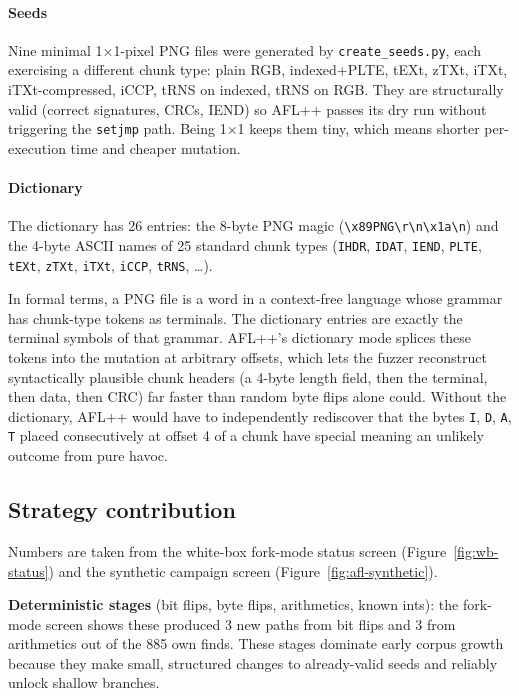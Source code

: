 \paragraph{Seeds}
Nine minimal 1×1-pixel PNG files were generated by \verb|create_seeds.py|, each exercising a different chunk type: plain RGB, indexed+PLTE, tEXt, zTXt, iTXt, iTXt-compressed, iCCP, tRNS on indexed, tRNS on RGB. They are structurally valid (correct signatures, CRCs, IEND) so AFL++ passes its dry run without triggering the \verb|setjmp| path. Being 1×1 keeps them tiny, which means shorter per-execution time and cheaper mutation.
\vspace{-10pt}
\paragraph{Dictionary}
The dictionary has 26 entries: the 8-byte PNG magic (\verb|\x89PNG\r\n\x1a\n|) and the 4-byte ASCII names of 25 standard chunk types (\verb|IHDR|, \verb|IDAT|, \verb|IEND|, \verb|PLTE|, \verb|tEXt|, \verb|zTXt|, \verb|iTXt|, \verb|iCCP|, \verb|tRNS|, …).

In formal terms, a PNG file is a word in a context-free language whose grammar has chunk-type tokens as terminals. The dictionary entries are exactly the terminal symbols of that grammar. AFL++'s dictionary mode splices these tokens into the mutation at arbitrary offsets, which lets the fuzzer reconstruct syntactically plausible chunk headers (a 4-byte length field, then the terminal, then data, then CRC) far faster than random byte flips alone could. Without the dictionary, AFL++ would have to independently rediscover that the bytes \verb|I|, \verb|D|, \verb|A|, \verb|T| placed consecutively at offset 4 of a chunk have special meaning an unlikely outcome from pure havoc.
\vspace{-8pt}
\subsection{Strategy contribution}
Numbers are taken from the white-box fork-mode status screen
(Figure~\ref{fig:wb-status}) and the synthetic campaign screen
(Figure~\ref{fig:afl-synthetic}).

\setlength{\parindent}{0pt}
\vspace{4pt}
\textbf{Deterministic stages} (bit flips, byte flips, arithmetics,
known ints): the fork-mode screen shows these produced 3 new paths
from bit flips and 3 from arithmetics out of the 885 own finds.
These stages dominate early corpus growth because they make small,
structured changes to already-valid seeds and reliably unlock
shallow branches.

